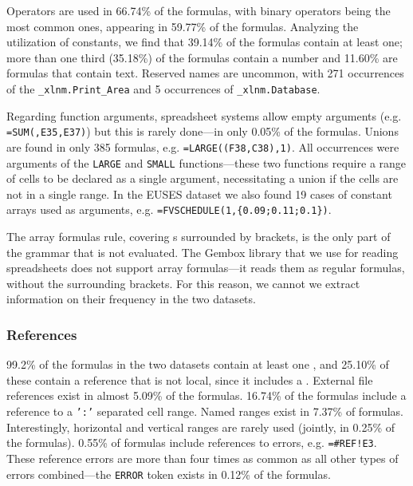 \documentclass[conference]{IEEEtran}
\begin{document}
Operators are used in 66.74\% of the formulas, with binary operators being the most common ones, appearing in 59.77\% of the formulas. Analyzing the utilization of constants, we find that 39.14\% of the formulas contain at least one; more than one third (35.18\%) of the formulas contain a number and 11.60\% are formulas that contain text. Reserved names are uncommon, with 271 occurrences of the \texttt{_xlnm.Print_Area} and 5 occurrences of \texttt{_xlnm.Database}.

Regarding function arguments, spreadsheet systems allow empty arguments (e.g. \texttt{=SUM(,E35,E37)}) but this is rarely done---in only 0.05\% of the formulas. Unions are found in only 385 formulas, e.g. \texttt{=LARGE((F38,C38),1)}. All occurrences were arguments of the \texttt{LARGE} and \texttt{SMALL} functions---these two functions require a range of cells to be declared as a single argument, necessitating a union if the cells are not in a single range. In the EUSES dataset we also found 19 cases of constant arrays used as arguments, e.g. \texttt{=FVSCHEDULE(1,\{0.09;0.11;0.1\})}.

The array formulas rule, covering s surrounded by brackets, is the only part of the grammar that is not evaluated. The Gembox library that we use for reading spreadsheets does not support array formulas---it reads them as regular formulas, without the surrounding brackets. For this reason, we cannot we extract information on their frequency in the two datasets.

\subsubsection{References}

99.2\% of the formulas in the two datasets contain at least one , and 25.10\% of these contain a reference that is not local, since it includes a . External file references exist in almost 5.09\% of the formulas. 16.74\% of the formulas include a reference to a \texttt{':'} separated cell range. Named ranges exist in 7.37\% of formulas. Interestingly, horizontal and vertical ranges are rarely used (jointly, in 0.25\% of the formulas). 0.55\% of formulas include references to errors, e.g. \texttt{=\#REF!E3}. These reference errors are more than four times as common as all other types of errors combined---the \texttt{ERROR} token exists in 0.12\% of the formulas.
\end{document}
